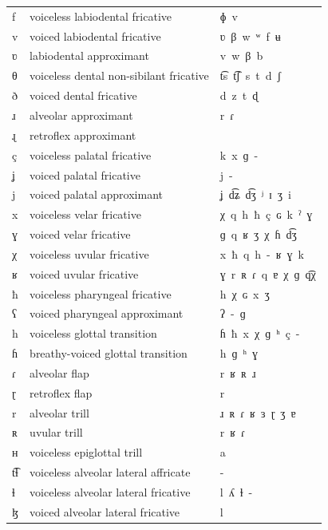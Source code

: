 \begin{center}
\begin{tabular}{lll}
\hline
f & voiceless labiodental fricative & ɸ\ \color{gray}v\\
v & voiced labiodental fricative & ʋ\ β\ w\ ʷ\ \color{gray}f\ ʉ\\
ʋ & labiodental approximant & v\ w\ β\ \color{gray}b\\
θ & voiceless dental non-sibilant fricative & t͡s\ t͡ʃ\ s\ t\ d\ \color{gray}ʃ\\
ð & voiced dental fricative & d\ z\ t\ \color{gray}ɖ\\
ɹ & alveolar approximant & r\ \color{gray}ɾ\\
ɻ & retroflex approximant & \\
ç & voiceless palatal fricative & k\ x\ ɡ\ \color{gray}-\\
ʝ & voiced palatal fricative & j\ \color{gray}-\\
j & voiced palatal approximant & ʝ\ d͡ʑ\ d͡ʒ\ ʲ\ \color{gray}ɪ\ ʒ\ i\\
x & voiceless velar fricative & χ\ q\ h\ ħ\ ç\ ɢ\ \color{gray}k\ ˀ\ ɣ\\
ɣ & voiced velar fricative & ɡ\ q\ ʁ\ \color{gray}ʒ\ χ\ ɦ\ d͡ʒ\\
χ & voiceless uvular fricative & x\ ħ\ q\ h\ \color{gray}-\ ʁ\ ɣ\ k\\
ʁ & voiced uvular fricative & ɣ\ r\ ʀ\ ɾ\ q\ ɐ\ χ\ \color{gray}ɡ\ q͡χ\\
ħ & voiceless pharyngeal fricative & h\ χ\ ɢ\ x\ \color{gray}ʒ\\
ʕ & voiced pharyngeal approximant & ʔ\ -\ ɡ\\
h & voiceless glottal transition & ɦ\ ħ\ x\ χ\ ɡ\ \color{gray}ʰ\ ç\ -\\
ɦ & breathy-voiced glottal transition & h\ ɡ\ \color{gray}ʰ\ ɣ\\
ɾ & alveolar flap & r\ ʁ\ ʀ\ \color{gray}ɹ\\
ɽ & retroflex flap & r\\
r & alveolar trill & ɹ\ ʀ\ ɾ\ ʁ\ ɜ\ ɽ\ \color{gray}ʒ\ ɐ\\
ʀ & uvular trill & r\ ʁ\ ɾ\\
ʜ & voiceless epiglottal trill & a\\
t͡ɬ & voiceless alveolar lateral affricate & -\\
ɬ & voiceless alveolar lateral fricative & l\ ʎ\ ɫ\ \color{gray}-\\
ɮ & voiced alveolar lateral fricative & l\\

\end{tabular}
\end{center}
